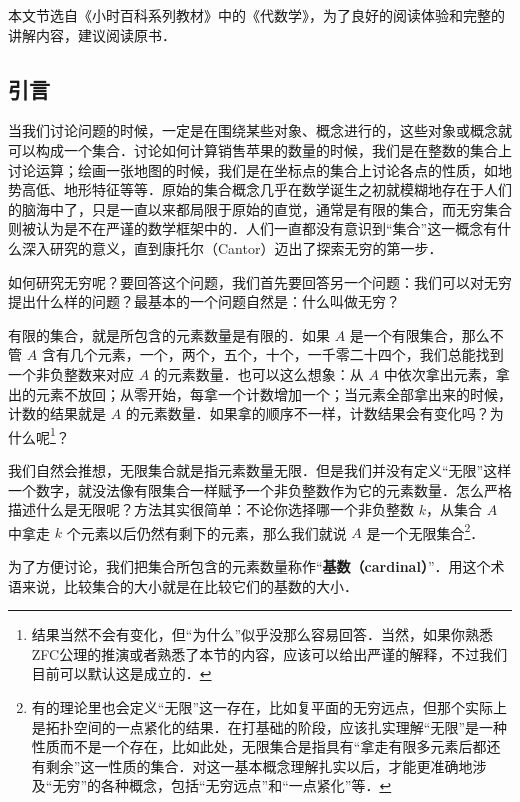 

本文节选自《小时百科系列教材》中的《代数学》，为了良好的阅读体验和完整的讲解内容，建议阅读原书．

\subsection{引言}

当我们讨论问题的时候，一定是在围绕某些对象、概念进行的，这些对象或概念就可以构成一个集合．讨论如何计算销售苹果的数量的时候，我们是在整数的集合上讨论运算；绘画一张地图的时候，我们是在坐标点的集合上讨论各点的性质，如地势高低、地形特征等等．原始的集合概念几乎在数学诞生之初就模糊地存在于人们的脑海中了，只是一直以来都局限于原始的直觉，通常是有限的集合，而无穷集合则被认为是不在严谨的数学框架中的．人们一直都没有意识到“集合”这一概念有什么深入研究的意义，直到康托尔（Cantor）迈出了探索无穷的第一步．

如何研究无穷呢？要回答这个问题，我们首先要回答另一个问题：我们可以对无穷提出什么样的问题？最基本的一个问题自然是：什么叫做无穷？

有限的集合，就是所包含的元素数量是有限的．如果 $A$ 是一个有限集合，那么不管 $A$ 含有几个元素，一个，两个，五个，十个，一千零二十四个，我们总能找到一个非负整数来对应 $A$ 的元素数量．也可以这么想象：从 $A$ 中依次拿出元素，拿出的元素不放回；从零开始，每拿一个计数增加一个；当元素全部拿出来的时候，计数的结果就是 $A$ 的元素数量．如果拿的顺序不一样，计数结果会有变化吗？为什么呢\footnote{结果当然不会有变化，但“为什么”似乎没那么容易回答．当然，如果你熟悉ZFC公理的推演或者熟悉了本节的内容，应该可以给出严谨的解释，不过我们目前可以默认这是成立的．}？

我们自然会推想，无限集合就是指元素数量无限．但是我们并没有定义“无限”这样一个数字，就没法像有限集合一样赋予一个非负整数作为它的元素数量．怎么严格描述什么是无限呢？方法其实很简单：不论你选择哪一个非负整数 $k$，从集合 $A$ 中拿走 $k$ 个元素以后仍然有剩下的元素，那么我们就说 $A$ 是一个无限集合\footnote{有的理论里也会定义“无限”这一存在，比如复平面的无穷远点，但那个实际上是拓扑空间的一点紧化的结果．在打基础的阶段，应该扎实理解“无限”是一种性质而不是一个存在，比如此处，无限集合是指具有“拿走有限多元素后都还有剩余”这一性质的集合．对这一基本概念理解扎实以后，才能更准确地涉及“无穷”的各种概念，包括“无穷远点”和“一点紧化”等．}．

为了方便讨论，我们把集合所包含的元素数量称作“\textbf{基数（cardinal）}”．用这个术语来说，比较集合的大小就是在比较它们的基数的大小．

